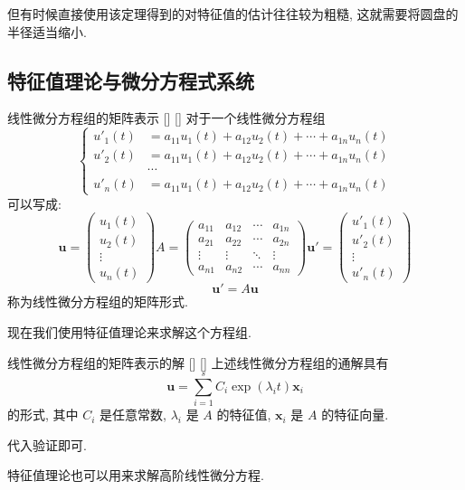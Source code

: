 \documentclass[UTF8]{ctexart}
\DeclareMathOperator{\0}{\mathbf{0}}
\DeclareMathOperator{\<}{\langle}
\renewcommand{\>}{\rangle}
\begin{document}
		但有时候直接使用该定理得到的对特征值的估计往往较为粗糙, 这就需要将圆盘的半径适当缩小. 

	\subsection{特征值理论与微分方程式系统}
		
		\begin{dfn}
			[]
			{线性微分方程组的矩阵表示}
			[]
			[]
			对于一个线性微分方程组\[ \begin{cases}
				u'_1(t)&=a_{11}u_1(t)+a_{12}u_2(t)+\cdots+a_{1n}u_n(t)\\
				u'_2(t)&=a_{11}u_1(t)+a_{12}u_2(t)+\cdots+a_{1n}u_n(t)\\
				&\cdots\\
				u'_n(t)&=a_{11}u_1(t)+a_{12}u_2(t)+\cdots+a_{1n}u_n(t)
			\end{cases}
			\]
			可以写成: 
			\[ \mathbf{u}=\begin{pmatrix}
				u_{1}(t)\\u_{2}(t)\\\vdots\\u_{n}(t)
			\end{pmatrix}
			A=\begin{pmatrix}
				a_{11}&a_{12}&\cdots&a_{1n}\\a_{21}&a_{22}&\cdots&a_{2n}\\\vdots&\vdots&\ddots&\vdots\\a_{n1}&a_{n2}&\cdots&a_{nn}
			\end{pmatrix}
			\mathbf{u}'=\begin{pmatrix}
				u'_{1}(t)\\u'_{2}(t)\\\vdots\\u'_{n}(t)
			\end{pmatrix}
			\]
			\[\mathbf{u}'=A\mathbf{u}  
			\]
			称为线性微分方程组的矩阵形式.
		\end{dfn}
		现在我们使用特征值理论来求解这个方程组. 
		\begin{thm}
			[]
			{线性微分方程组的矩阵表示的解}
			[]
			[]
			上述线性微分方程组的通解具有\[\mathbf{u}=\sum_{i=1}^{s}C_i\exp(\lambda_i t)\mathbf{x}_i
			\]
			的形式, 其中 \(C_i\) 是任意常数,  \(\lambda_i\) 是 \(A\) 的特征值,  \(\mathbf{x}_i\) 是 \(A\) 的特征向量. 
		\end{thm}
		\begin{prf}
			代入验证即可. 
		\end{prf}
		特征值理论也可以用来求解高阶线性微分方程. 
		
\end{document}

